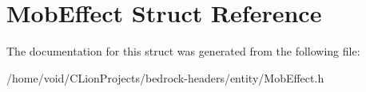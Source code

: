 \hypertarget{struct_mob_effect}{}\section{Mob\+Effect Struct Reference}
\label{struct_mob_effect}


The documentation for this struct was generated from the following file\+:\begin{DoxyCompactItemize}
\item 
/home/void/\+C\+Lion\+Projects/bedrock-\/headers/entity/Mob\+Effect.\+h\end{DoxyCompactItemize}
